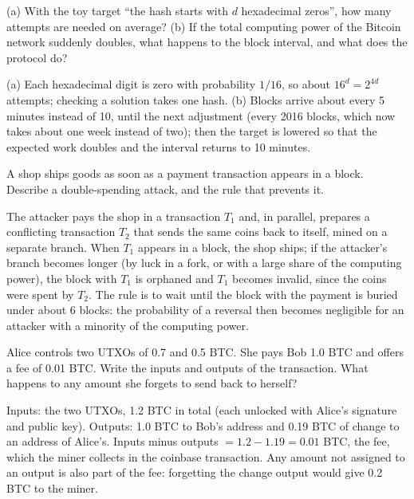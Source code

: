 \begin{exercise}
(a) With the toy target \enquote{the hash starts with $d$ hexadecimal zeros}, how many attempts are needed on average? (b) If the total computing power of the Bitcoin network suddenly doubles, what happens to the block interval, and what does the protocol do?
\end{exercise}
\begin{solution}
(a) Each hexadecimal digit is zero with probability $1/16$, so about $16^d = 2^{4d}$ attempts; checking a solution takes one hash. (b) Blocks arrive about every 5 minutes instead of 10, until the next adjustment (every 2016 blocks, which now takes about one week instead of two); then the target is lowered so that the expected work doubles and the interval returns to 10 minutes.
\end{solution}

\begin{exercise}
A shop ships goods as soon as a payment transaction appears in a block. Describe a double-spending attack, and the rule that prevents it.
\end{exercise}
\begin{solution}
The attacker pays the shop in a transaction $T_1$ and, in parallel, prepares a conflicting transaction $T_2$ that sends the same coins back to itself, mined on a separate branch. When $T_1$ appears in a block, the shop ships; if the attacker's branch becomes longer (by luck in a fork, or with a large share of the computing power), the block with $T_1$ is orphaned and $T_1$ becomes invalid, since the coins were spent by $T_2$. The rule is to wait until the block with the payment is buried under about 6 blocks: the probability of a reversal then becomes negligible for an attacker with a minority of the computing power.
\end{solution}

\begin{exercise}
Alice controls two UTXOs of 0.7 and 0.5 BTC. She pays Bob 1.0 BTC and offers a fee of 0.01 BTC. Write the inputs and outputs of the transaction. What happens to any amount she forgets to send back to herself?
\end{exercise}
\begin{solution}
Inputs: the two UTXOs, 1.2 BTC in total (each unlocked with Alice's signature and public key). Outputs: 1.0 BTC to Bob's address and 0.19 BTC of change to an address of Alice's. Inputs minus outputs $= 1.2 - 1.19 = 0.01$ BTC, the fee, which the miner collects in the coinbase transaction. Any amount not assigned to an output is also part of the fee: forgetting the change output would give 0.2 BTC to the miner.
\end{solution}

